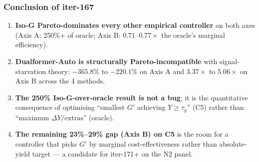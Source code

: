 \subsubsection*{Conclusion of iter-167}

\begin{enumerate}
\item \textbf{Iso-G Pareto-dominates every other empirical controller} on
      both axes (Axis A: 250\%+ of oracle; Axis B: $0.71$--$0.77\times$
      the oracle's marginal efficiency).
\item \textbf{Dualformer-Auto is structurally Pareto-incompatible} with
      signal-starvation theory: $-365.8\%$ to $-220.1\%$ on Axis A and
      $3.37\times$ to $5.06\times$ on Axis B across the 4 methods.
\item \textbf{The 250\% Iso-G-over-oracle result is not a bug}; it is the
      quantitative consequence of optimising
      ``smallest $G'$ achieving $Y \geq \tau_y$'' (C5) rather than
      ``maximum $\Delta Y / \mathrm{extras}$'' (oracle).
\item \textbf{The remaining 23\%--29\% gap (Axis B) on C5} is the room for
      a controller that picks $G'$ by marginal cost-effectiveness rather
      than absolute-yield target --- a candidate for iter-171+ on the
      N2 panel.
\end{enumerate}

